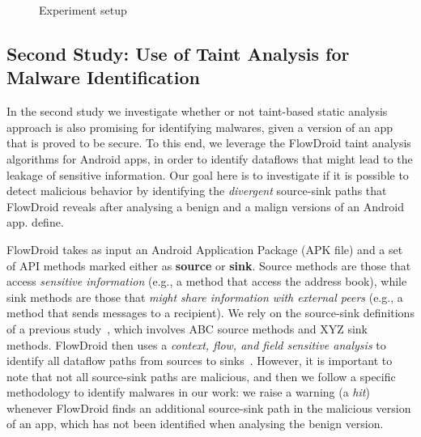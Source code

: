 \begin{figure}[ht]
   \label{Experiment setup}
   \caption{Experiment setup}
   \label{fig:setup}
 \end{figure}

\subsection{Second Study: Use of Taint Analysis for Malware Identification}\label{sec:set2}

In the second study 
we investigate whether or not taint-based static analysis approach is also promising for
identifying malwares, given a version of an app that is proved to be secure.
To this end, we leverage the FlowDroid
taint analysis algorithms for Android apps, in order to identify dataflows
that might lead to the leakage of sensitive information. Our
goal here is to investigate if it is possible to detect malicious
behavior by identifying the \emph{divergent} source-sink paths that FlowDroid reveals after
analysing a benign and a malign versions of an Android app.
define.

FlowDroid takes as input an Android Application Package (APK file) and
a set of API methods marked either as {\bf source}
or {\bf sink}. Source methods are those that access \emph{sensitive information} (e.g.,
a method that access the address book), while sink methods are those 
that \emph{might share information with external peers} (e.g., a method that
sends messages to a recipient). We rely on the source-sink definitions of a previous
study~\cite{}, which involves ABC source methods and XYZ sink methods.
FlowDroid then uses a \emph{context, flow, and field
sensitive analysis} to identify all dataflow paths from sources to sinks~\cite{}.
However, it is important to note that not all source-sink paths are malicious, and then we
follow a specific methodology to identify malwares in our work: we raise a
warning (a \emph{hit}) whenever
FlowDroid finds an additional source-sink path in the malicious version of an app, which
has not been identified when analysing the benign version.


